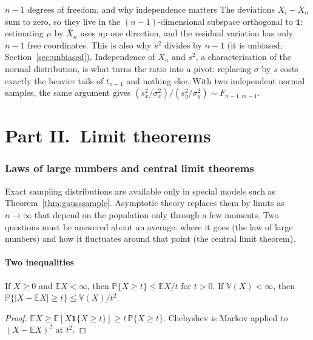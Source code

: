 \documentclass[11pt,a4paper]{article}
\newcommand{\E}{\mathbb{E}}
\newcommand{\V}{\mathbb{V}}
\renewcommand{\P}{\mathbb{P}}
\newcommand{\one}{\mathbf 1}
\newcommand{\Xbar}{\bar X_n}
\begin{document}
\begin{whybox}{$n-1$ degrees of freedom, and why independence matters}
The deviations $X_i-\Xbar$ sum to zero, so they live in the $(n-1)$-dimensional subspace orthogonal to $\one$: estimating $\mu$ by $\Xbar$ uses up one direction, and the residual variation has only $n-1$ free coordinates. This is also why $s^2$ divides by $n-1$ (it is unbiased; Section~\ref{sec:unbiased}). Independence of $\Xbar$ and $s^2$, a characterisation of the normal distribution, is what turns the ratio into a pivot: replacing $\sigma$ by $s$ costs exactly the heavier tails of $t_{n-1}$ and nothing else. With two independent normal samples, the same argument gives $(s_x^2/\sigma_x^2)/(s_y^2/\sigma_y^2)\sim F_{n-1,m-1}$.
\end{whybox}

\clearpage
\part*{Part II.\ Limit theorems}

\section{Laws of large numbers and central limit theorems}\label{sec:limits}

Exact sampling distributions are available only in special models such as Theorem~\ref{thm:gausssample}. Asymptotic theory replaces them by limits as $n\to\infty$ that depend on the population only through a few moments. Two questions must be answered about an average: where it goes (the law of large numbers) and how it fluctuates around that point (the central limit theorem).

\subsection{Two inequalities}

\begin{theorem}
If $X\ge0$ and $\E X<\infty$, then $\P\{X\ge t\}\le\E X/t$ for $t>0$. If $\V(X)<\infty$, then $\P\{|X-\E X|\ge t\}\le\V(X)/t^2$.
\end{theorem}

\begin{proof}
$\E X\ge\E[X\one\{X\ge t\}]\ge t\,\P\{X\ge t\}$. Chebyshev is Markov applied to $(X-\E X)^2$ at $t^2$.
\end{proof}
\end{document}
